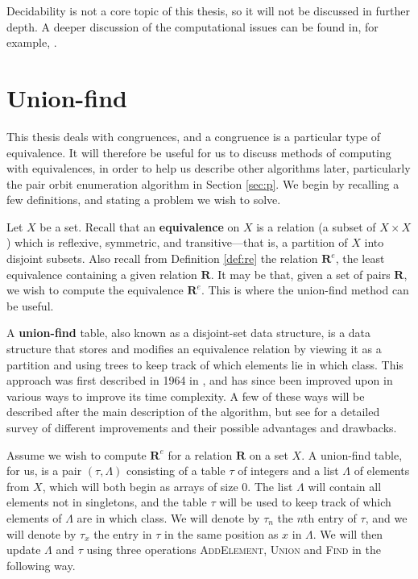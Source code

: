 Decidability is not a core topic of this thesis, so it will not be discussed in
further depth.  A deeper discussion of the computational issues can be found in,
for example, \cite{enderton_2001}.

\section{Union-find}
\label{sec:union-find}
This thesis deals with congruences, and a congruence is a particular type of
equivalence.  It will therefore be useful for us to discuss methods of computing
with equivalences, in order to help us describe other algorithms later,
particularly the pair orbit enumeration algorithm in Section \ref{sec:p}.  We
begin by recalling a few definitions, and stating a problem we wish to solve.

Let $X$ be a set.  Recall that an \textbf{equivalence} on $X$ is a relation (a
subset of $X \times X$) which is reflexive, symmetric, and transitive---that is,
a partition of $X$ into disjoint subsets.  Also recall from Definition
\ref{def:re} the relation $\mathbf{R}^e$, the least equivalence containing a
given relation $\mathbf{R}$.  It may be that, given a set of pairs $\mathbf{R}$,
we wish to compute the equivalence $\mathbf{R}^e$.  This is where the union-find
method can be useful.

A \textbf{union-find} table, also known as a disjoint-set data structure, is a
data structure that stores and modifies an equivalence relation by viewing it as
a partition and using trees to keep track of which elements lie in which class.
This approach was
first described in 1964 in \cite{galler_1964}, and has since been improved upon
in various ways to improve its time complexity.  A few of these ways will be
described after the main description of the algorithm, but see \cite{galil_1991}
for a detailed survey of different improvements and their possible advantages
and drawbacks.

Assume we wish to compute $\mathbf{R}^e$ for a relation $\mathbf{R}$ on a set
$X$.  A union-find table, for us, is a pair $(\tau, \Lambda)$ consisting of a
table $\tau$ of integers and a list $\Lambda$ of elements from $X$, which will
both begin as arrays of size $0$.  The list $\Lambda$ will contain all elements
not in singletons, and the table $\tau$ will be used to keep track of which
elements of $\Lambda$ are in which class.  We will denote by $\tau_n$ the $n$th
entry of $\tau$, and we will denote by $\tau_x$ the entry in $\tau$ in the same
position as $x$ in $\Lambda$.  We will then update $\Lambda$ and $\tau$ using
three operations \textsc{AddElement}, \textsc{Union} and \textsc{Find} in the
following way.

